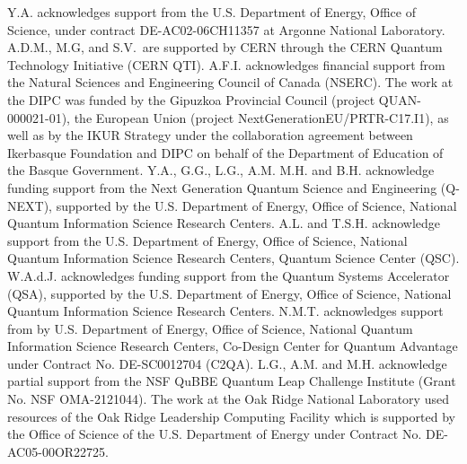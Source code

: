 \begin{acknowledgments}

Y.A. acknowledges support from the U.S. Department of Energy, Office of Science, under contract DE-AC02-06CH11357 at Argonne National Laboratory.
A.D.M., M.G, and S.V.\ are supported by CERN through the CERN Quantum Technology Initiative (CERN QTI). A.F.I. acknowledges financial support from the Natural Sciences 
and Engineering Council of Canada (NSERC).
The work at the DIPC was funded by the Gipuzkoa Provincial Council (project QUAN-000021-01), the European Union (project NextGenerationEU/PRTR-C17.I1), as well as by the IKUR Strategy under the collaboration agreement between Ikerbasque Foundation and DIPC on behalf of the Department of Education of the Basque Government.
Y.A., G.G., L.G., A.M. M.H. and B.H. acknowledge funding support from the Next Generation Quantum Science and Engineering (Q-NEXT), supported by the U.S. Department of Energy, Office of Science, National Quantum Information Science Research Centers. A.L. and T.S.H. acknowledge support from the U.S. Department of Energy, Office of Science, National Quantum Information Science Research Centers, Quantum Science Center (QSC). W.A.d.J. acknowledges funding support from the Quantum Systems Accelerator (QSA), supported by the U.S. Department of Energy, Office of Science, National Quantum Information Science Research Centers.  N.M.T. acknowledges support from by U.S. Department of Energy, Office of Science,
National Quantum Information Science Research Centers, Co-Design Center for Quantum Advantage under
Contract No. DE-SC0012704 (C2QA).
L.G., A.M. and M.H. acknowledge partial support from the NSF QuBBE Quantum Leap Challenge Institute (Grant No. NSF OMA-2121044). 
The work at the Oak Ridge National Laboratory used resources of the Oak Ridge Leadership Computing Facility which is supported by the Office of Science of the U.S. Department of Energy under Contract No. DE-AC05-00OR22725.
\end{acknowledgments}